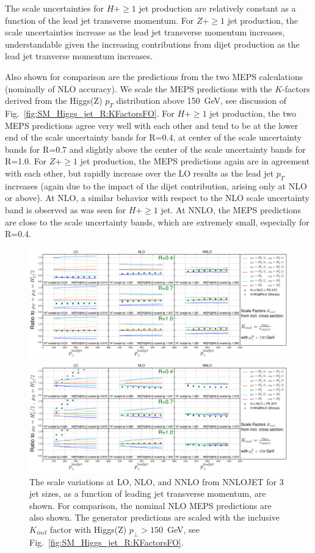 \documentclass[aps,prd,onecolumn,fleqn,superscriptaddress,groupedaddress,nofootinbib,preprintnumbers,nobalancelastpage]{revtex4}
\begin{document}
The scale uncertainties for $H +\ge1$ jet production are relatively constant as a function of the lead jet transverse momentum. For $Z +\ge1$ jet production, the scale uncertainties increase as the lead jet transverse momentum increases, understandable given the increasing contributions from dijet production as the lead jet tranverse momentum increases. 

Also shown for
comparison are the predictions from the two MEPS calculations (nominally of NLO
accuracy). We scale the MEPS predictions with the $K$-factors derived from the
Higgs(Z) $p_T$ distribution above 150~GeV, see discussion of Fig.~\ref{fig:SM_Higgs_jet_R:KFactorsFO}. For $H +\ge1$ jet production, the two MEPS predictions agree very well with each other and tend to be at the lower end of the scale uncertainty bands for R=0.4, at center of the scale uncertainty bands for R=0.7 and slightly above the center of the scale uncertainty bands for R=1.0. For $Z +\ge1$ jet production, the MEPS predictions again are in agreement with each other, but rapidly increase over the LO results as the lead jet $p_T$ increases (again due to the impact of the dijet contribution, arising only at NLO or above). At NLO, a similar behavior with respect to the NLO scale uncertainty band is observed as was seen for $H +\ge1$ jet. At NNLO, the MEPS predictions are close to the scale uncertainty bands, which are extremely small, especially for R=0.4. 


\begin{figure}[t]
\centerline{\includegraphics[width=\textwidth]{plots/Fig_V_16_Higgs.pdf}}
\centerline{\includegraphics[width=\textwidth]{plots/Fig_V_16_ZJ.pdf}}
\caption{The scale variations at LO, NLO, and NNLO from 
NNLOJET for 3 jet
sizes, as a function of leading jet transverse momentum, are shown.  For comparison,
the nominal NLO MEPS predictions are also shown. The generator predictions are
scaled with the inclusive $K_{incl}$ factor with Higgs(Z) $p_\perp > 150$~GeV,
see Fig.~\ref{fig:SM_Higgs_jet_R:KFactorsFO}. } 
\label{fig:SM_Higgs_jet_R:ScaleVariationsFO}
\end{figure}
\end{document}
